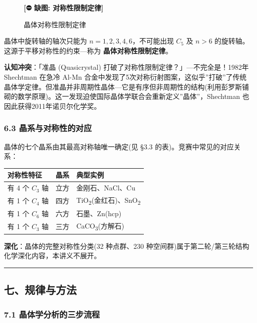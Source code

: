 \documentclass[a4paper,11pt]{ctexart}
\newcounter{none}
\newcommand{\箭}{\ensuremath{\rightarrow}}
\newcommand{\左箭}{\ensuremath{\leftarrow}}
\newcommand{\上箭}{\ensuremath{\uparrow}}
\newcommand{\下箭}{\ensuremath{\downarrow}}
\newcommand{\衡}{\ensuremath{\rightleftharpoons}}
\newcommand{\双箭}{\ensuremath{\leftrightarrow}}
\newcommand{\约等于}{\ensuremath{\approx}}
\newcommand{\小于等于}{\ensuremath{\leq}}
\newcommand{\大于等于}{\ensuremath{\geq}}
\newcommand{\不等于}{\ensuremath{\neq}}
\newcommand{\西格马}{\ensuremath{\sigma}}
\newcommand{\派}{\ensuremath{\pi}}
\begin{document}
\begin{figure}[H]\centering
\textbf{[⛔ 缺图: 对称性限制定律]}
\caption{晶体对称性限制定律}
\end{figure}

晶体中旋转轴的轴次只能为 \(n = 1, 2, 3, 4, 6\)，不可能出现 \(C_5\) 及 \(n > 6\) 的旋转轴。这源于平移对称性的约束---称为 \textbf{晶体对称性限制定律}。

\textbf{认知冲突}：「准晶 (Quasicrystal) 打破了对称性限制定律？」---不完全是！1982年 Shechtman 在急冷 Al-Mn 合金中发现了5次对称衍射图案，这似乎''打破''了传统晶体学定律。但准晶并非周期性晶体---它是有序但非周期性的结构(利用彭罗斯铺砌的数学原理)。这一发现迫使国际晶体学联合会重新定义''晶体''，Shechtman 也因此获得2011年诺贝尔化学奖。

\subsubsection{6.3 晶系与对称性的对应}\label{ux6676ux7cfbux4e0eux5bf9ux79f0ux6027ux7684ux5bf9ux5e94}

晶体的七个晶系由其最高对称轴唯一确定(见 §3.3 的表)。竞赛中常见的对应关系：

{\def\LTcaptype{none} %
\begin{longtable}[]{@{}lcl@{}}
\toprule\noalign{}
对称性特征 & 晶系 & 典型实例 \\
\midrule\noalign{}
\endhead
\bottomrule\noalign{}
\endlastfoot
有 4 个 \(C_3\) 轴 & 立方 & 金刚石、NaCl、Cu \\
有 1 个 \(C_4\) 轴 & 四方 & TiO\textsubscript{2}(金红石)、SnO\textsubscript{2} \\
有 1 个 \(C_6\) 轴 & 六方 & 石墨、Zn(hcp) \\
有 1 个 \(C_3\) 轴 & 三方 & CaCO\textsubscript{3}(方解石) \\
\end{longtable}
}

\textbf{深化}：晶体的完整对称性分类(32 种点群、230 种空间群)属于第二轮/第三轮结构化学深化内容，本讲义不展开。

\begin{center}\rule{0.5\linewidth}{0.5pt}\end{center}

\subsection{七、规律与方法}\label{ux4e03ux89c4ux5f8bux4e0eux65b9ux6cd5}

\subsubsection{7.1 晶体学分析的三步流程}\label{ux6676ux4f53ux5b66ux5206ux6790ux7684ux4e09ux6b65ux6d41ux7a0b}
\end{document}
